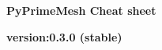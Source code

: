 \documentclass[9pt,landscape]{article}
\begin{document}
\raggedright
\footnotesize


\begin{center}
     \Huge{\textbf{PyPrimeMesh Cheat sheet}} \\
\end{center}
\begin{center}
  \small{\textbf{version:0.3.0 (stable)}} \\
\end{center}
\vspace{-0.15cm}
\noindent\makebox[\linewidth]{\rule{\paperwidth}{2pt}}
\end{document}
